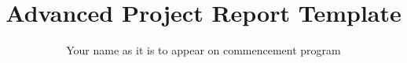 \title{Advanced Project Report Template}
\author{Your name as it is to appear on commencement program}
\newcommand{\supervisor}{Your project supervisor's name}
\date{}

